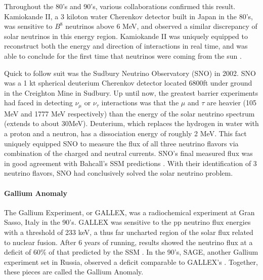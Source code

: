 \par Throughout the 80's and 90's, various collaborations confirmed this result. Kamiokande II, a 3 kiloton water Cherenkov detector built in Japan in the 80's, was sensitive to $B^8$ neutrinos above 6 MeV, and observed a similar discrepancy of solar neutrinos in this energy region. Kamiokande II was uniquely equipped to reconstruct both the energy and direction of interactions in real time, and was able to conclude for the first time that neutrinos were coming from the sun \cite{bib:kam0}. %
\par Quick to follow suit was the Sudbury Neutrino Observatory (SNO) in 2002.  SNO was a 1 kt spherical deuterium Cherenkov detector located 6800ft under ground in the Creighton Mine in Sudbury. Up until now, the greatest barrier experiments had faced in detecting $\nu_\mu$ or $\nu_\tau$ interactions was that the $\mu$ and $\tau$ are heavier (105 MeV and 1777 MeV respectively) than the energy of the solar neutrino spectrum (extends to about 30MeV). Deuterium, which replaces the hydrogen in water with a proton and a neutron, has a dissociation energy of roughly 2 MeV. This fact uniquely equipped SNO to measure the flux of all three neutrino flavors via combination of the charged and neutral currents. SNO's final measured flux was in good agreement with Bahcall's SSM predictions \cite{bib:sno}.  With their identification of 3 neutrino flavors, SNO had conclusively solved the solar neutrino problem.  
\paragraph{Gallium Anomaly} The Gallium Experiment, or GALLEX, was a radiochemical experiment at Gran Sasso, Italy in the 90's. GALLEX was sensitive to the pp neutrino flux energies with a threshold of 233 keV, a thus far uncharted region of the solar flux related to nuclear fusion. After 6 years of running, results showed the neutrino flux at a deficit of 60\% of that predicted by the SSM \cite{bib:gal0}. In the 90's, SAGE, another Gallium experiment set in Russia, observed a deficit comparable to GALLEX's \cite{bib:sage}.  Together, these pieces are called the Gallium Anomaly.  

